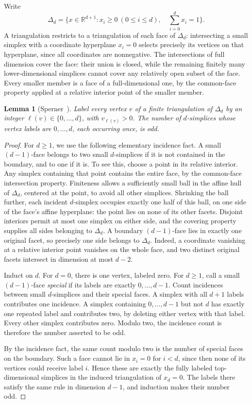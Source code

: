 \documentclass[11pt]{amsart}
\newcommand{\R}{\mathbb R}
\newtheorem{lemma}[theorem]{Lemma}
\theoremstyle{definition}
\theoremstyle{remark}
\numberwithin{equation}{section}
\begin{document}
Write
\[
 \Delta_d=\{x\in\R^{d+1}:x_i\ge0\ (0\le i\le d),\quad
                                  \sum_{i=0}^d x_i=1\}.
\]
A triangulation restricts to a triangulation of each face of
\(\Delta_d\): intersecting a small simplex with a coordinate
hyperplane \(x_i=0\) selects precisely its vertices on that
hyperplane, since all coordinates are nonnegative. The intersections
of full dimension cover the face: their union is closed, while the
remaining finitely many lower-dimensional simplices cannot cover
any relatively open subset of the face. Every smaller member is a
face of a full-dimensional one, by the common-face property applied
at a relative interior point of the smaller member.

\begin{lemma}[Sperner~\cite{Sperner1928}]\label{lemma:sperner}
Label every vertex \(v\) of a finite triangulation of \(\Delta_d\)
by an integer \(\ell(v)\in\{0,\ldots,d\}\), with
\(v_{\ell(v)}>0\). The number of \(d\)-simplices whose vertex
labels are \(0,\ldots,d\), each occurring once, is odd.
\end{lemma}
\begin{proof}
For \(d\ge1\), we use the following elementary incidence fact.
A small \((d-1)\)-face belongs to two small \(d\)-simplices if
it is not contained in the boundary, and to one if it is.
To see this, choose a point in its relative interior. Any simplex containing that point
contains the entire face, by the common-face intersection property.
Finiteness allows a sufficiently small ball in the affine hull of
\(\Delta_d\), centered at the point, to avoid all other simplices.
Shrinking the ball further, each incident \(d\)-simplex occupies
exactly one half of this ball, on one side of the face's affine
hyperplane: the point lies on none of its other facets. Disjoint
interiors permit at most one simplex on either side, and the covering
property supplies all sides belonging to \(\Delta_d\). A boundary
\((d-1)\)-face lies in exactly one original facet, so precisely one
side belongs to \(\Delta_d\). Indeed, a coordinate vanishing at a
relative interior point vanishes on the whole face, and two distinct
original facets intersect in dimension at most \(d-2\).

Induct on \(d\). For \(d=0\), there is one vertex, labeled zero.
For \(d\ge1\), call a small \((d-1)\)-face \emph{special} if
its labels are exactly \(0,\ldots,d-1\). Count incidences between
small \(d\)-simplices and their special faces. A simplex with all
\(d+1\) labels contributes one incidence. A simplex containing
\(0,\ldots,d-1\) but not \(d\) has exactly one repeated label
and contributes two, by deleting either vertex with that label.
Every other simplex contributes zero. Modulo two, the incidence
count is therefore the number asserted to be odd.

By the incidence fact, the same count modulo two is the number of
special faces on the boundary. Such a face cannot lie in
\(x_i=0\) for \(i<d\), since then none of its vertices could
receive label \(i\). Hence these are exactly the fully labeled
top-dimensional simplices in the induced triangulation of
\(x_d=0\). The labels there satisfy the same rule in dimension
\(d-1\), and induction makes their number odd.
\end{proof}
\end{document}
